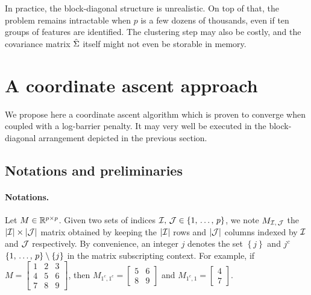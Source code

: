 \bigbreak
In practice, the block-diagonal structure is unrealistic.
On top of that, the problem remains intractable when $p$ is a few dozens of thousands,
even if ten groups of features are identified.
The clustering step may also be costly,
and the covariance matrix $\hat{\Sigma}$ itself might not even be storable in memory.

\section{A coordinate ascent approach}\label{sec:coordinate_ascent}

We propose here a coordinate ascent algorithm which is proven to converge when coupled with a log-barrier penalty.
It may very well be executed in the block-diagonal arrangement depicted in the previous section.

\subsection{Notations and preliminaries}\label{subsec:notations_preliminaries}

\paragraph{Notations.}
Let $M \in \mathbb{R}^{p \times p}$.
Given two sets of indices $\mathcal{I},\,\mathcal{J} \in \left\{ 1,\, \dots,\, p \right\}$,
we note $M_{\mathcal{I},\,\mathcal{J}}$ the $\left\lvert\mathcal{I}\right\rvert \times \left\lvert\mathcal{J}\right\rvert$ matrix obtained by keeping
the $\left\lvert\mathcal{I}\right\rvert$ rows and $\left\lvert\mathcal{J}\right\rvert$ columns indexed by $\mathcal{I}$ and $\mathcal{J}$ respectively.
By convenience, an integer $j$ denotes the set $\left\{ j \right\}$ and $j^c$ $\left\{ 1,\, \dots,\, p \right\} \setminus \left\{ j \right\}$
in the matrix subscripting context.
For example, if $M = \begin{bmatrix}
    1 & 2 & 3\\
    4 & 5 & 6\\
    7 & 8 & 9
\end{bmatrix}$,
then $M_{1^c, 1^c} = \begin{bmatrix}
    5 & 6\\
    8 & 9
\end{bmatrix}$
and $M_{1^c, 1} = \begin{bmatrix}
    4\\
    7
\end{bmatrix}$.

